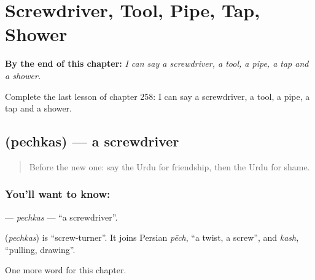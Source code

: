 
\chapter{Screwdriver, Tool, Pipe, Tap, Shower}
\label{ch:ur-screwdriver-tool-pipe-tap-shower}

\begin{chapteropening}
\textbf{By the end of this chapter:} \emph{I can say a screwdriver, a tool, a pipe, a tap and a shower.}

Complete the last lesson of chapter 258: I can say a screwdriver, a tool, a pipe, a tap and a shower.
\end{chapteropening}

\section[\texorpdfstring{\ur{پیچ} \ur{کس} (pechkas)}{پیچ کس (pechkas)}]{  (pechkas) — a screwdriver}

\label{lesson:UR-C258-pechkas}



\begin{quote}
Before the new one: say the Urdu for friendship, then the Urdu for shame.
\end{quote}

\subsection*{You'll want to know:  }
\textbf{ } — \emph{pechkas} — \textquotedblleft{}a screwdriver\textquotedblright{}.

\begin{cousinweb}
\textbf{ } (\emph{pechkas}) is \textquotedblleft{}screw-turner\textquotedblright{}. It joins Persian \emph{pēch}, \textquotedblleft{}a twist, a screw\textquotedblright{}, and \emph{kash}, \textquotedblleft{}pulling, drawing\textquotedblright{}.
\end{cousinweb}

\begin{grammarlens}[title={What you've built}]
One more word for this chapter.
\end{grammarlens}

